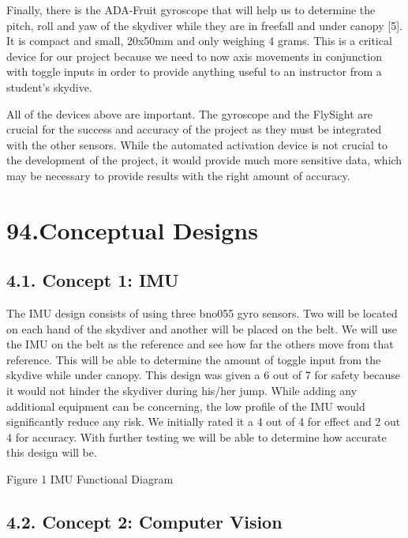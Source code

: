 \documentclass[10pt]{article}
\begin{document}
Finally, there is the ADA-Fruit gyroscope that will help us to determine the pitch, roll and yaw of the skydiver while they are in freefall and under canopy [5]. It is compact and small, 20x50mm and only weighing 4 grams. This is a critical device for our project because we need to now axis movements in conjunction with toggle inputs in order to provide anything useful to an instructor from a student’s skydive.



All of the devices above are important. The gyroscope and the FlySight are crucial for the success and accuracy of the project as they must be integrated with the other sensors. While the automated activation device is not crucial to the development of the project, it would provide much more sensitive data, which may be necessary to provide results with the right amount of accuracy.









\section{94.Conceptual Designs}

\subsection{4.1. Concept 1: IMU}

The IMU design consists of using three bno055 gyro sensors. Two will be located on each hand of the skydiver and another will be placed on the belt. We will use the IMU on the belt as the reference and see how far the others move from that reference. This will be able to determine the amount of toggle input from the skydive while under canopy. This design was given a 6 out of 7 for safety because it would not hinder the skydiver during his/her jump. While adding any additional equipment can be concerning, the low profile of the IMU would significantly reduce any risk. We initially rated it a 4 out of 4 for effect and 2 out 4 for accuracy. With further testing we will be able to determine how accurate this design will be.

Figure 1 IMU Functional Diagram



\subsection{4.2. Concept 2: Computer Vision}
\end{document}
